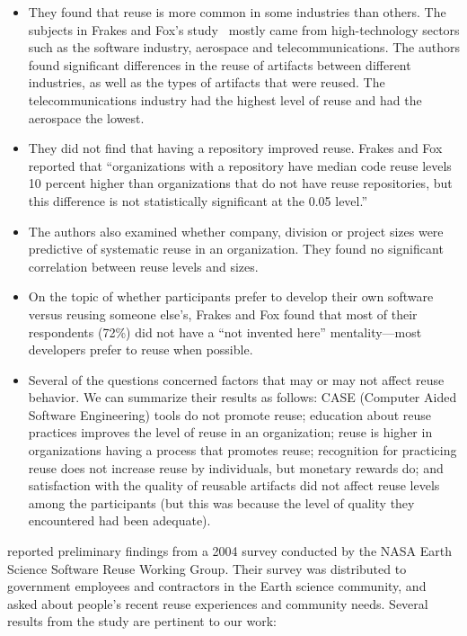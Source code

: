 \documentclass{casicswhitepaper}
\begin{document}
\begin{itemize}

\item They found that reuse is more common in some industries than others.  The subjects in Frakes and Fox's study~\cite{frakes1995sixteen} mostly came from high-technology sectors such as the software industry, aerospace and telecommunications.  The authors found significant differences in the reuse of artifacts between different industries, as well as the types of artifacts that were reused.  The telecommunications industry had the highest level of reuse and had the aerospace the lowest.

\item They did not find that having a repository improved reuse.  Frakes and Fox reported that ``organizations with a repository have median code reuse levels 10 percent higher than organizations that do not have reuse repositories, but this difference is not statistically significant at the 0.05 level.''

\item The authors also examined whether company, division or project sizes were predictive of systematic reuse in an organization.  They found no significant correlation between reuse levels and sizes.

\item On the topic of whether participants prefer to develop their own software versus reusing someone else's, Frakes and Fox found that most of their respondents (72\%) did not have a ``not invented here'' mentality---most developers prefer to reuse when possible.

\item Several of the questions concerned factors that may or may not affect reuse behavior.  We can summarize their results as follows: CASE (Computer Aided Software Engineering) tools do not promote reuse; education about reuse practices improves the level of reuse in an organization; reuse is higher in organizations having a process that promotes reuse;  recognition for practicing reuse does not increase reuse by individuals, but monetary rewards do; and satisfaction with the quality of reusable artifacts did not affect reuse levels among the participants (but this was because the level of quality they encountered had been adequate).

\end{itemize}

\citet{samadi_2004} reported preliminary findings from a 2004 survey conducted by the NASA Earth Science Software Reuse Working Group. Their survey was distributed to government employees and contractors in the Earth science community, and asked about people's recent reuse experiences and community needs.  Several results from the study are pertinent to our work:
\end{document}
